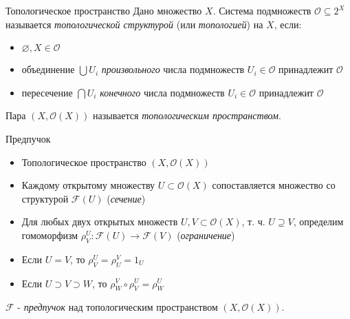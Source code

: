 \documentclass{beamer}
\begin{document}
\begin{frame}{Топологическое пространство}
Дано множество $X$. Система подмножеств $\mathcal{O} \subseteq 2^X$ называется \textit{топологической структурой} (или \textit{топологией}) на $X$, если:\\
\bigskip
\begin{itemize}
	\item $\varnothing, X \in \mathcal{O}$
	\item объединение $\bigcup U_i$ \textit{произвольного} числа подмножеств $U_i \in \mathcal{O}$ принадлежит $\mathcal{O}$
	\item пересечение $\bigcap U_i$ \textit{конечного} числа подмножеств $U_i \in \mathcal{O}$ принадлежит $\mathcal{O}$
\end{itemize}
\bigskip
Пара $(X, \mathcal{O}(X))$ называется \textit{топологическим пространством}.
\end{frame}

\begin{frame}{Предпучок}
\begin{itemize}
	\item Топологическое пространство $(X, \mathcal{O}(X))$
	\item Каждому открытому множеству $U \subset \mathcal{O}(X)$ сопоставляется множество со структурой $\mathcal{F}(U)$ (\textit{сечение})
	\item Для любых двух открытых множеств $U, V \subset \mathcal{O}(X)$, т. ч. $U \supseteq V$, определим гомоморфизм $\rho^U_V : \mathcal{F}(U) \to \mathcal{F}(V)$ (\textit{ограничение})
	\item Если $U = V$, то $\rho^U_V = \rho^V_U = 1_U$
	\item Если $U \supset V \supset W$, то $\rho^V_W \circ \rho^U_V = \rho^U_W$
\end{itemize}
\bigskip
$\mathcal{F}$ - \textit{предпучок} над топологическим пространством $(X, \mathcal{O}(X))$.
\end{frame}
\end{document}
